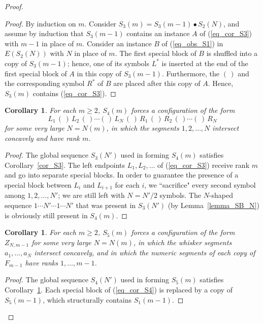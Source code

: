 \documentclass[11pt]{article}
\newtheorem{corollary}[theorem]{Corollary}
\theoremstyle{definition}
\theoremstyle{remark}
\begin{document}
\begin{proof}
\begin{proof}
By induction on $m$. Consider $S_3(m) = S_3(m-1)\bullet S_2(N)$, and assume by induction that $S_3(m-1)$ contains an instance $A$ of (\ref{eq_cor_S3}) with $m-1$ in place of $m$. Consider an instance $B$ of (\ref{eq_obs_S1}) in $E(S_2(N))$ with $N$ in place of $m$. The first special block of $B$ is shuffled into a copy of $S_3(m-1)$; hence, one of its symbols $L^*$ is inserted at the end of the first special block of $A$ in this copy of $S_3(m-1)$. Furthermore, the $(\,)$ and the corresponding symbol $R^*$ of $B$ are placed after this copy of $A$. Hence, $S_3(m)$ contains (\ref{eq_cor_S3}). 
\end{proof}

\begin{corollary}\label{cor_S4}
For each $m\ge 2$, $S_4(m)$ forces a configuration of the form
\begin{equation}\label{eq_cor_S4}
L_1\,(\,)\,L_2\,(\,)\cdots(\,)\,L_N\,(\,)\,R_1\,(\,)\,R_2\,(\,)\cdots(\,)\,R_N
\end{equation}
for some very large $N=N(m)$, in which the segments $1,2,\ldots, N$ intersect concavely and have rank $m$.
\end{corollary}

\begin{proof}
The global sequence $S_3(N')$ used in forming $S_4(m)$ satisfies Corollary~\ref{cor_S3}. The left endpoints $L_1, L_2, \ldots$ of (\ref{eq_cor_S3}) receive rank $m$ and go into separate special blocks. In order to guarantee the presence of a special block between $L_i$ and $L_{i+1}$ for each $i$, we ``sacrifice" every second symbol among $1,2,\ldots,N'$; we are still left with $N=N'/2$ symbols. The $N$-shaped sequence $1\cdots N'\cdots 1\cdots N'$ that was present in $S_3(N')$ (by Lemma~\ref{lemma_SB_N}) is obviously still present in $S_4(m)$.
\end{proof}

\begin{corollary}\label{cor_S5}
For each $m\ge 2$, $S_5(m)$ forces a configuration of the form $Z_{N,m-1}$ for some very large $N = N(m)$, in which the whisker segments $a_1, \ldots,\allowbreak a_N$ intersect concavely, and in which the numeric segments of each copy of $F_{m-1}$ have ranks $1,\ldots,m-1$.
\end{corollary}

\begin{proof}
The global sequence $S_4(N')$ used in forming $S_5(m)$ satisfies Corollary~\ref{cor_S4}. Each special block of (\ref{eq_cor_S4}) is replaced by a copy of $S_5(m-1)$, which structurally contains $S_1(m-1)$.
\end{proof}


\end{proof}
\end{document}
